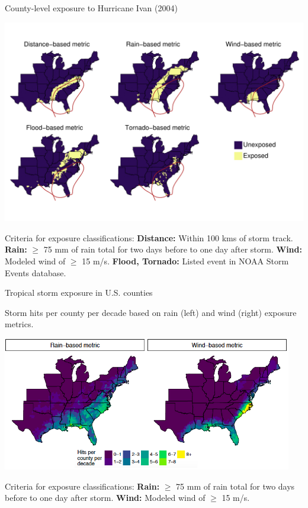 \documentclass[ignorenonframetext,]{beamer}
\begin{document}
\begin{frame}{County-level exposure to Hurricane Ivan (2004)}

\vspace{-0.6cm} \includegraphics{ivanexposure.pdf}

\vspace{-0.7cm} \scriptsize Criteria for exposure classifications:
\textbf{Distance:} Within 100 kms of storm track. \textbf{Rain:} \(\ge\)
75 mm of rain total for two days before to one day after storm.
\textbf{Wind:} Modeled wind of \(\ge\) 15 m/s. \textbf{Flood, Tornado:}
Listed event in NOAA Storm Events database.

\end{frame}

\begin{frame}{Tropical storm exposure in U.S. counties}

\begin{centering}
\small Storm hits per county per decade based on rain (left) and wind (right) exposure metrics.
\end{centering}

\begin{center}\includegraphics[width=0.95\textwidth]{hurricane_exposure} \end{center}

\vspace{-0.7cm} \scriptsize Criteria for exposure classifications:
\textbf{Rain:} \(\ge\) 75 mm of rain total for two days before to one
day after storm. \textbf{Wind:} Modeled wind of \(\ge\) 15 m/s.

\end{frame}
\end{document}
